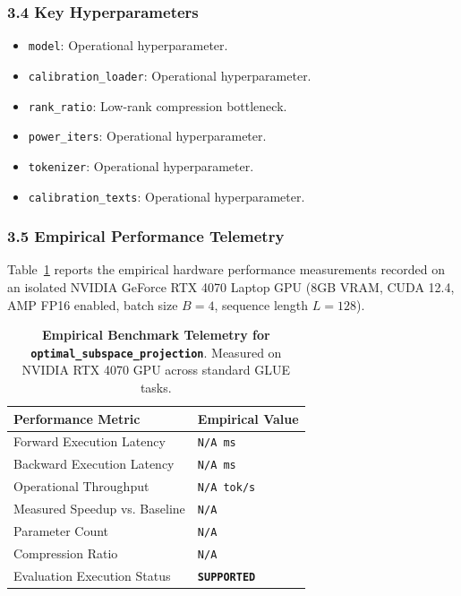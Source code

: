 \subsubsection*{3.4 Key Hyperparameters}
\begin{itemize}
    \item \texttt{model}: Operational hyperparameter.
    \item \texttt{calibration\_loader}: Operational hyperparameter.
    \item \texttt{rank\_ratio}: Low-rank compression bottleneck.
    \item \texttt{power\_iters}: Operational hyperparameter.
    \item \texttt{tokenizer}: Operational hyperparameter.
    \item \texttt{calibration\_texts}: Operational hyperparameter.
\end{itemize}

\subsubsection*{3.5 Empirical Performance Telemetry}
Table~\ref{tab:telemetry_optimal\_subspace\_projection} reports the empirical hardware performance measurements recorded on an isolated NVIDIA GeForce RTX 4070 Laptop GPU (8GB VRAM, CUDA 12.4, AMP FP16 enabled, batch size $B=4$, sequence length $L=128$).

\begin{table}[h]
\centering
\small
\caption{\textbf{Empirical Benchmark Telemetry for \texttt{optimal\_subspace\_projection}}. Measured on NVIDIA RTX 4070 GPU across standard GLUE tasks.}
\label{tab:telemetry_optimal\_subspace\_projection}
\begin{tabularx}{\columnwidth}{lX}
\toprule
\textbf{Performance Metric} & \textbf{Empirical Value} \\
\midrule
Forward Execution Latency & \texttt{N/A ms} \\
Backward Execution Latency & \texttt{N/A ms} \\
Operational Throughput & \texttt{N/A tok/s} \\
Measured Speedup vs. Baseline & \texttt{N/A} \\
Parameter Count & \texttt{N/A} \\
Compression Ratio & \texttt{N/A} \\
Evaluation Execution Status & \textbf{\texttt{SUPPORTED}} \\
\bottomrule
\end{tabularx}
\end{table}

